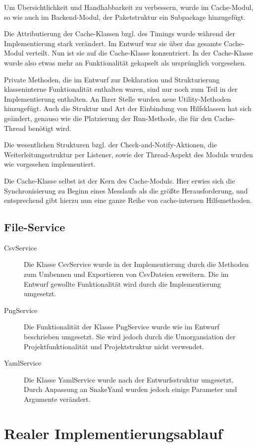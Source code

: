 \documentclass[parskip=full]{scrartcl}
\begin{document}
Um Übersichtlichkeit und Handhabbarkeit zu verbessern, wurde im Cache-Modul, so wie auch im Backend-Modul, der Paketstruktur ein Subpackage hinzugefügt. 

Die Attributierung der Cache-Klassen bzgl. des Timings wurde während der Implementierung stark verändert. Im Entwurf war sie über das gesamte Cache-Modul verteilt. Nun ist sie auf die Cache-Klasse konzentriert. In der Cache-Klasse wurde also etwas mehr an Funktionalität gekapselt als ursprünglich vorgesehen. 

Private Methoden, die im Entwurf zur Deklaration und Strukturierung klasseninterne Funktionalität enthalten waren, sind nur noch zum Teil in der Implementierung enthalten. An Ihrer Stelle wurden neue Utility-Methoden hinzugefügt. Auch die Struktur und Art der Einbindung von Hilfsklassen hat sich geändert, genauso wie die Platzierung der Run-Methode, die für den Cache-Thread benötigt wird. 

Die wesentlichen Strukturen bzgl. der Check-and-Notify-Aktionen, die Weiterleitungsstruktur per Listener, sowie der Thread-Aspekt des Moduls wurden wie vorgesehen implementiert. 

Die Cache-Klasse selbst ist der Kern des Cache-Moduls. Hier erwies sich die Synchronisierung zu Beginn eines Messlaufs als die größte Herausforderung, und entsprechend gibt hierzu nun eine ganze Reihe von cache-internen Hilfsmethoden. 

\subsection{File-Service}
\begin{description}
\item[CsvService] Die Klasse CsvService wurde in der Implementierung durch die Methoden zum Umbennen und Exportieren von CsvDateien erweitern. Die im Entwurf gewollte Funktionalität wird durch die Implementierung umgesetzt.
\item[PngService] Die Funktionalität der Klasse PngService wurde wie im Entwurf beschrieben umgesetzt. Sie wird jedoch durch die Umorgansiation der Projektfunktionalität und Projektstruktur nicht verwendet.
\item[YamlService] Die Klasse YamlService wurde nach der Entwurfsstruktur umgesetzt. Durch Anpassung an SnakeYaml wurden jedoch einige Parameter und Argumente verändert.

\end{description}

\section{Realer Implementierungsablauf}
\end{document}
